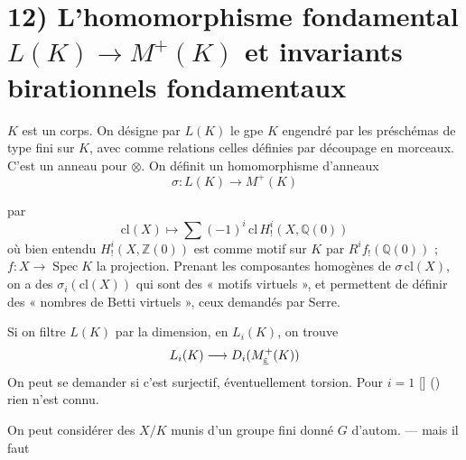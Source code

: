 \documentclass[11pt,a4paper]{article}
\begin{document}

\section{12) L'homomorphisme fondamental $L(K) \to M^{+}(K)$ et invariants birationnels fondamentaux}

$K$ est un corps. On désigne par $L(K)$ le gpe $K$ engendré par les préschémas de type fini sur $K$, avec comme relations celles définies par découpage en morceaux. C'est un anneau pour $\otimes$. On définit un homomorphisme d'anneaux
\[
  \sigma : L(K) \longrightarrow M^{+}(K)
\]

par
\[
  \mathrm{cl}(X) \longmapsto \sum (-1)^{i}\, \mathrm{cl}\, H^{i}_{!}(X, \mathbb{Q}(0))
\]
où bien entendu $H^{i}_{!}(X, \mathbb{Z}(0))$ est   comme motif sur $K$ par $R^{i}f_{!}(\mathbb{Q}(0))$ ; $f : X \to \operatorname{Spec} K$ la projection. Prenant les composantes homogènes de $\sigma\,\mathrm{cl}(X)$, on a des $\sigma_{i}(\mathrm{cl}(X))$ qui sont des « motifs virtuels », et permettent de définir des « nombres de Betti virtuels », ceux demandés par Serre.

Si on filtre $L(K)$ par la dimension, en $L_{i}(K)$, on trouve
\[
  L_{i}(K) \longrightarrow D_{i}(M^{+}_{\uncertain{\varepsilon}}(K))
\]
On peut se demander si c'est surjectif,  \ill{} éventuellement  \ill{} torsion.  Pour $i = 1$ \ill{} [] () rien n'est connu.

On peut \ill{}  \ill{} considérer des $X/K$ munis d'un groupe fini donné $G$ d'autom. --- mais il faut
\end{document}
